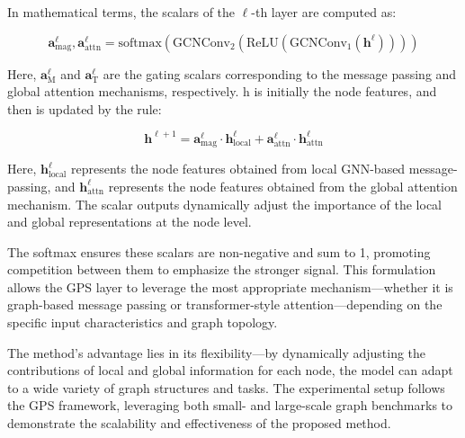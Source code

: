 \documentclass{acmart}
\begin{document}
In mathematical terms, the scalars of the $\ell$-th layer are computed as:

\begin{equation}
\mathbf{a}_{\text{mag}}^{\ell}, \mathbf{a}_{\text{attn}}^{\ell} = \text{softmax}\left(\text{GCNConv}_2\left(\text{ReLU}\left(\text{GCNConv}_1(\mathbf{h}^{\ell})\right)\right)\right)
\end{equation}


Here, \( \mathbf{a}_{\text{M}}^{\ell} \) and \( \mathbf{a}_{\text{T}}^{\ell} \) are the gating scalars corresponding to the message passing and global attention mechanisms, respectively. h is initially the node features, and then is updated by the rule:

\[
\mathbf{h}^{\ell+1} = \mathbf{a}_{\text{mag}}^{\ell} \cdot \mathbf{h}_{\text{local}}^{\ell} + \mathbf{a}_{\text{attn}}^{\ell} \cdot \mathbf{h}_{\text{attn}}^{\ell}
\]

Here, $\mathbf{h}_{\text{local}}^{\ell}$ represents the node features obtained from local GNN-based message-passing, and $\mathbf{h}_{\text{attn}}^{\ell}$ represents the node features obtained from the global attention mechanism. The scalar outputs dynamically adjust the importance of the local and global representations at the node level.

The softmax ensures these scalars are non-negative and sum to 1, promoting competition between them to emphasize the stronger signal. This formulation allows the GPS layer to leverage the most appropriate mechanism—whether it is graph-based message passing or transformer-style attention—depending on the specific input characteristics and graph topology.


The method's advantage lies in its flexibility—by dynamically adjusting the contributions of local and global information for each node, the model can adapt to a wide variety of graph structures and tasks. The experimental setup follows the GPS framework, leveraging both small- and large-scale graph benchmarks to demonstrate the scalability and effectiveness of the proposed method.
\end{document}
